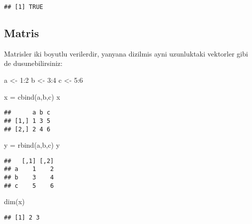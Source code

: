 \documentclass[
]{book}
\newenvironment{Shaded}{\begin{snugshade}}{\end{snugshade}}
\newcommand{\DecValTok}[1]{\textcolor[rgb]{0.00,0.00,0.81}{#1}}
\newcommand{\FunctionTok}[1]{\textcolor[rgb]{0.00,0.00,0.00}{#1}}
\newcommand{\NormalTok}[1]{#1}
\newcommand{\OtherTok}[1]{\textcolor[rgb]{0.56,0.35,0.01}{#1}}
\newcommand{\SpecialCharTok}[1]{\textcolor[rgb]{0.00,0.00,0.00}{#1}}
\begin{document}
\begin{verbatim}
## [1] TRUE
\end{verbatim}

\hypertarget{matris}{%
\subsection{Matris}\label{matris}}

Matrisler iki boyutlu verilerdir, yanyana dizilmis ayni uzunluktaki vektorler gibi de dusunebilirsiniz:

\begin{Shaded}
\begin{Highlighting}[]
\NormalTok{a }\OtherTok{\textless{}{-}} \DecValTok{1}\SpecialCharTok{:}\DecValTok{2}
\NormalTok{b }\OtherTok{\textless{}{-}} \DecValTok{3}\SpecialCharTok{:}\DecValTok{4}
\NormalTok{c }\OtherTok{\textless{}{-}} \DecValTok{5}\SpecialCharTok{:}\DecValTok{6}
\end{Highlighting}
\end{Shaded}

\begin{Shaded}
\begin{Highlighting}[]
\NormalTok{x }\OtherTok{=} \FunctionTok{cbind}\NormalTok{(a,b,c)}
\NormalTok{x}
\end{Highlighting}
\end{Shaded}

\begin{verbatim}
##      a b c
## [1,] 1 3 5
## [2,] 2 4 6
\end{verbatim}

\begin{Shaded}
\begin{Highlighting}[]
\NormalTok{y }\OtherTok{=} \FunctionTok{rbind}\NormalTok{(a,b,c)}
\NormalTok{y}
\end{Highlighting}
\end{Shaded}

\begin{verbatim}
##   [,1] [,2]
## a    1    2
## b    3    4
## c    5    6
\end{verbatim}

\begin{Shaded}
\begin{Highlighting}[]
\FunctionTok{dim}\NormalTok{(x)}
\end{Highlighting}
\end{Shaded}

\begin{verbatim}
## [1] 2 3
\end{verbatim}
\end{document}
